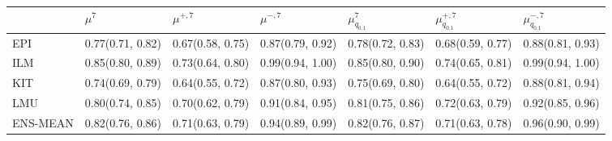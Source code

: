 \begin{tabular}{l p{} p{} p{} p{} p{} p{}}
\toprule
 & $\mu^{7}$ & $\mu^{+, 7}$ & $\mu^{-, 7}$ & $\mu^{7}_{q_{0.1}}$ & $\mu^{+, 7}_{q_{0.1}}$ & $\mu^{-, 7}_{q_{0.1}}$ \\
\midrule
EPI & {0.77\newline(0.71, 0.82)} & {0.67\newline(0.58, 0.75)} & {0.87\newline(0.79, 0.92)} & {0.78\newline(0.72, 0.83)} & {0.68\newline(0.59, 0.77)} & {0.88\newline(0.81, 0.93)} \\
ILM & {0.85\newline(0.80, 0.89)} & {0.73\newline(0.64, 0.80)} & {0.99\newline(0.94, 1.00)} & {0.85\newline(0.80, 0.90)} & {0.74\newline(0.65, 0.81)} & {0.99\newline(0.94, 1.00)} \\
KIT & {0.74\newline(0.69, 0.79)} & {0.64\newline(0.55, 0.72)} & {0.87\newline(0.80, 0.93)} & {0.75\newline(0.69, 0.80)} & {0.64\newline(0.55, 0.72)} & {0.88\newline(0.81, 0.94)} \\
LMU & {0.80\newline(0.74, 0.85)} & {0.70\newline(0.62, 0.79)} & {0.91\newline(0.84, 0.95)} & {0.81\newline(0.75, 0.86)} & {0.72\newline(0.63, 0.79)} & {0.92\newline(0.85, 0.96)} \\
ENS-MEAN & {0.82\newline(0.76, 0.86)} & {0.71\newline(0.63, 0.79)} & {0.94\newline(0.89, 0.99)} & {0.82\newline(0.76, 0.87)} & {0.71\newline(0.63, 0.78)} & {0.96\newline(0.90, 0.99)} \\

\end{tabular}
